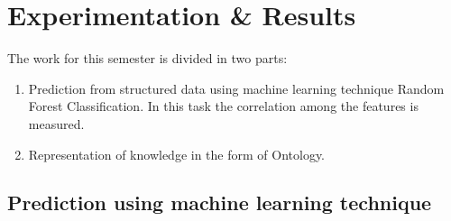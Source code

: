 \documentclass[journal,onecolumn,11pt]{IEEEtran}
\begin{document}
\section{Experimentation \& Results}
\label{experiment}
The work for this semester is divided in two parts:
\begin{enumerate}
\item Prediction from structured data using machine learning technique Random Forest Classification. In this task the correlation among the features is measured.
\item Representation of knowledge in the form of Ontology.
\end{enumerate}
\subsection{Prediction using machine learning technique}
\end{document}
